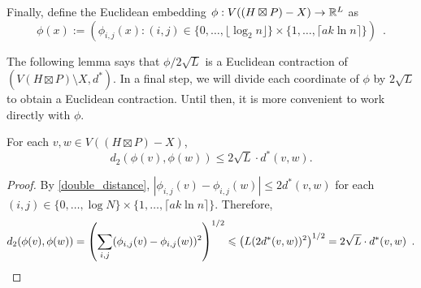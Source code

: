 \documentclass{patmorin}
\renewcommand{\le}{\leqslant}
\newcommand{\pat}[1]{\textcolor{Blue}{Pat: #1}}
\begin{document}
Finally, define the Euclidean embedding $\phi:V((H\boxtimes P)-X)\to\mathbb{R}^L$ as
\[
   \phi(x) := \left(\phi_{i,j}(x):(i,j)\in \{0,\ldots,\lfloor \log_2 n\rfloor\}\times\{1,\ldots,\lceil a k\ln n\rceil\}\right) \enspace .
\]


The following lemma says that $\phi/2\sqrt{L}$ is a Euclidean contraction of $(V(H\boxtimes P)\setminus X,d^*)$.  In a final step, we will divide each coordinate of $\phi$ by $2\sqrt{L}$ to obtain a Euclidean contraction. Until then, it is more convenient to work directly with $\phi$.

\begin{clm}\label{euclidean_contraction}
  For each $v,w\in V((H\boxtimes P)-X)$, $$d_2(\phi(v),\phi(w)) \le 2\sqrt{L}\cdot d^*(v,w).$$
\end{clm}

\begin{proof}
  By \cref{double_distance}, $|\phi_{i,j}(v)-\phi_{i,j}(w)|\le 2d^*(v,w)$ for each $(i,j)\in\{0,\ldots,\log N\}\times\{1,\ldots,\lceil ak\ln n\rceil\}$.  Therefore,
  \[
    d_2(\phi(v),\phi(w)) = \left(\sum_{i,j}(\phi_{i,j}(v)-\phi_{i,j}(w))^2\right)^{1/2}
    \le \left(L (2d^*(v,w))^2\right)^{1/2} = 2\sqrt{L}\cdot d^*(v,w) \enspace . \qedhere
  \]
\end{proof}



\end{document}

